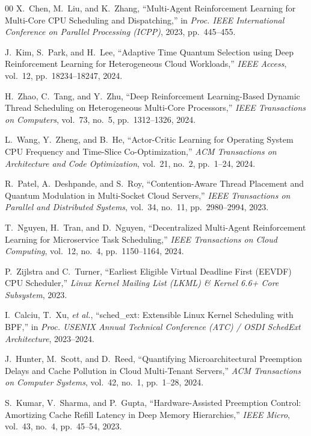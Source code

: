 \documentclass[journal]{IEEEtran}
\begin{document}
\begin{thebibliography}{00}
X.~Chen, M.~Liu, and K.~Zhang, ``Multi-Agent Reinforcement Learning for Multi-Core CPU Scheduling and Dispatching,'' in \emph{Proc. IEEE International Conference on Parallel Processing (ICPP)}, 2023, pp.~445--455.

J.~Kim, S.~Park, and H.~Lee, ``Adaptive Time Quantum Selection using Deep Reinforcement Learning for Heterogeneous Cloud Workloads,'' \emph{IEEE Access}, vol.~12, pp.~18234--18247, 2024.

H.~Zhao, C.~Tang, and Y.~Zhu, ``Deep Reinforcement Learning-Based Dynamic Thread Scheduling on Heterogeneous Multi-Core Processors,'' \emph{IEEE Transactions on Computers}, vol.~73, no.~5, pp.~1312--1326, 2024.

L.~Wang, Y.~Zheng, and B.~He, ``Actor-Critic Learning for Operating System CPU Frequency and Time-Slice Co-Optimization,'' \emph{ACM Transactions on Architecture and Code Optimization}, vol.~21, no.~2, pp.~1--24, 2024.

R.~Patel, A.~Deshpande, and S.~Roy, ``Contention-Aware Thread Placement and Quantum Modulation in Multi-Socket Cloud Servers,'' \emph{IEEE Transactions on Parallel and Distributed Systems}, vol.~34, no.~11, pp.~2980--2994, 2023.

T.~Nguyen, H.~Tran, and D.~Nguyen, ``Decentralized Multi-Agent Reinforcement Learning for Microservice Task Scheduling,'' \emph{IEEE Transactions on Cloud Computing}, vol.~12, no.~4, pp.~1150--1164, 2024.

P.~Zijlstra and C.~Turner, ``Earliest Eligible Virtual Deadline First (EEVDF) CPU Scheduler,'' \emph{Linux Kernel Mailing List (LKML) \& Kernel 6.6+ Core Subsystem}, 2023.

I.~Calciu, T.~Xu, \emph{et al.}, ``sched\_ext: Extensible Linux Kernel Scheduling with BPF,'' in \emph{Proc. USENIX Annual Technical Conference (ATC) / OSDI SchedExt Architecture}, 2023--2024.

J.~Hunter, M.~Scott, and D.~Reed, ``Quantifying Microarchitectural Preemption Delays and Cache Pollution in Cloud Multi-Tenant Servers,'' \emph{ACM Transactions on Computer Systems}, vol.~42, no.~1, pp.~1--28, 2024.

S.~Kumar, V.~Sharma, and P.~Gupta, ``Hardware-Assisted Preemption Control: Amortizing Cache Refill Latency in Deep Memory Hierarchies,'' \emph{IEEE Micro}, vol.~43, no.~4, pp.~45--54, 2023.


\end{thebibliography}
\end{document}
